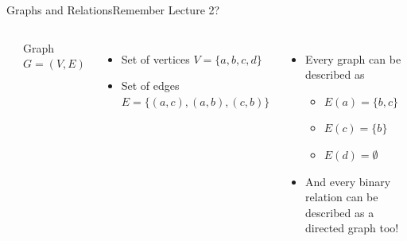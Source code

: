 \begin{frame}{Graphs and Relations}{Remember Lecture 2?}

  \begin{columns}
    \begin{center}
    \end{center}

    Graph $G = (V, E)$
    \begin{itemize}
      \item Set of vertices $V = \{a,b,c,d\}$
      \item Set of edges $E = \{(a,c),(a,b),(c,b)\}$
    \end{itemize}\bigskip

    \begin{itemize}
    \item Every graph can be described as 
    \begin{itemize}
      \item $E(a) = \{b,c\}$
      \item $E(c) = \{b\}$
      \item $E(d) = \emptyset$
    \end{itemize}
    
    \bigskip

    \item And every binary relation can be described as a directed graph too!
    \end{itemize}
  \end{columns}
\end{frame}

